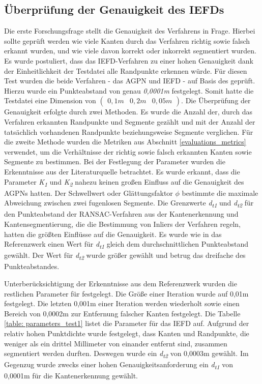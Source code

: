 \subsection{Überprüfung der Genauigkeit des IEFDs} \label{test_1}
Die erste Forschungsfrage stellt die Genauigkeit des Verfahrens in Frage. Hierbei sollte geprüft werden wie viele Kanten durch das Verfahren richtig sowie falsch erkannt wurden, und wie viele davon korrekt oder inkorrekt segmentiert wurden. Es wurde postuliert, dass das IEFD-Verfahren zu einer hohen Genauigkeit dank der Einheitlichkeit der Testdatei alle Randpunkte erkennen würde. Für diesen Test wurden die beide Verfahren - das AGPN und IEFD - auf Basis des \testcloud geprüft. Hierzu wurde ein Punkteabstand von genau \textit{0,0001m} festgelegt. Somit hatte die Testdatei eine Dimension von $\left(\begin{smallmatrix}
	0,1m & 0,2m & 0,05m
\end{smallmatrix}\right)$. Die Überprüfung der Genauigkeit erfolgte durch zwei Methoden. Es wurde die Anzahl der, durch das Verfahren erkannten Randpunkte und Segmente gezählt und mit der Anzahl der tatsächlich vorhandenen Randpunkte beziehungsweise Segmente verglichen. Für die zweite Methode wurden die Metriken aus Abschnitt \ref{evaluations_metrics} verwendet, um die Verhältnisse der richtig sowie falsch erkannten Kanten sowie Segmente zu bestimmen. Bei der Festlegung der Parameter wurden die Erkenntnisse aus der Literaturquelle betrachtet. Es wurde erkannt, dass die Parameter \textit{K\textsubscript{1}} und \textit{K\textsubscript{2}} nahezu keinen großen Einfluss auf die Genauigkeit des AGPNs hatten. Der Schwellwert oder Glättungsfaktor $\phi$ bestimmte die maximale Abweichung zwischen zwei fugenlosen Segmente. Die Grenzwerte \textit{d\textsubscript{t1}} und \textit{d\textsubscript{t2}} für den Punkteabstand der RANSAC-Verfahren aus der Kantenerkennung und Kantensegmentierung, die die Bestimmung von Inliers der Verfahren regeln, hatten die größten Einflüsse auf die Genauigkeit. Es wurde wie in das Referenzwerk einen Wert für \textit{d\textsubscript{t1}} gleich dem durchschnittlichen Punkteabstand gewählt. Der Wert für \textit{d\textsubscript{t2}} wurde größer gewählt und betrug das dreifache des Punkteabstandes. \autocite[10-11]{ni_edge_2016}

Unterberücksichtigung der Erkenntnisse aus dem Referenzwerk wurden die restlichen Parameter für \testcloud festgelegt. Die Größe einer Iteration wurde auf 0,01m festgelegt. Die letzten 0,001m einer Iteration werden wiederholt sowie einen Bereich von 0,0002m zur Entfernung falscher Kanten festgelegt. Die Tabelle \ref{table: parameters_test1} listet die Parameter für das IEFD auf. Aufgrund der relativ hohen Punktdichte wurde festgelegt, dass Kanten und Randpunkte, die weniger als ein drittel Millimeter von einander entfernt sind, zusammen segmentiert werden durften. Deswegen wurde ein \textit{d\textsubscript{t2}} von 0,0003m gewählt. Im Gegenzug wurde zwecks einer hohen Genauigkeitsanforderung ein \textit{d\textsubscript{t1}} von 0,0001m für die Kantenerkennung gewählt.

